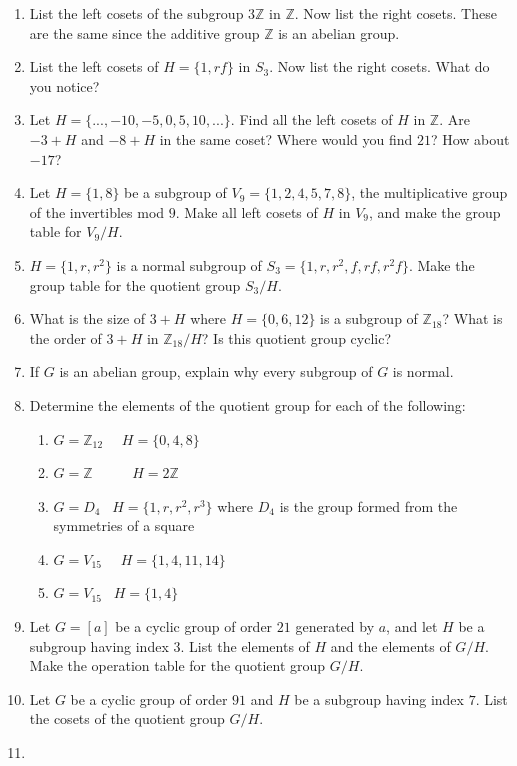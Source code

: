 \documentclass[12pt]{book}
\theoremstyle{definition}
\def\Z{\mathbb{Z}}
\begin{document}
\begin{enumerate}
	\item
	List the left cosets of the subgroup $3\Z$ in $\Z$. Now list the right cosets. These are the same since the additive group $\Z$ is an abelian group.
	
	\item
	List the left cosets of $H =\{1,rf\}$ in $S_3$. Now list the right cosets. What do you notice?
	\item
	Let $H = \{...,-10, -5,0,5,10,...\}$. Find all the left cosets of $H$ in $\Z$. Are $-3 + H$ and $-8+H$ in the same coset? Where would you find $21$? How about $-17$?
	\item
	Let $H = \{1,8\}$ be a subgroup of $V_9 =\{1,2,4,5,7,8\}$, the multiplicative group of the invertibles mod $9$. Make all left cosets of $H$ in $V_9$, and make the group table for $V_9/H$.
	\item
	$H=\{1,r,r^2\}$ is a normal subgroup of $S_3 =\{1,r,r^2,f,rf,r^2f\}$. Make the group table for the quotient group $S_3/H$.
	\item
	What is the size of $3 + H$ where $H=\{0,6,12\}$ is a subgroup of $\Z_{18}$? What is the order of $3 + H$ in $\Z_{18}/H$? Is this quotient group cyclic?
	\item
	If $G$ is an abelian group, explain why every subgroup of $G$ is normal.
	\item
	Determine the elements of the quotient group  for each of the following:
	\begin{enumerate}
		\item
		$G = \Z_{12}$~~    $H = \{0,4,8\}$
		\item
		$G = \Z$~~~~~            $H = 2\Z$
		\item
		$G = D_4$~         $H = \{1,r,r^2,r^3\}$ where $ D_4 $ is the group formed from the symmetries of a square
		\item
		$G = V_{15}$~~       $H = \{1,4,11,14\}$
		\item
		$G = V_{15}$~         $H = \{1,4\}$
	\end{enumerate}
	\item
	Let $G = [a]$ be a cyclic group of order $21$ generated by $a$, and let $H$ be a subgroup having index $3$.  List the elements of $H$ and the elements of $G/H$. Make the operation table for the quotient group $G/H$.
	\item
	Let $G$ be a cyclic group of order $91$ and $H$ be a subgroup having index $7$. List the cosets of the quotient group $G/H$.
	\item

\end{enumerate}
\end{document}
